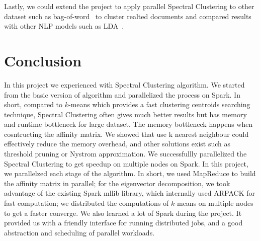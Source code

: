 \documentclass{acm_proc_article-sp}
\begin{document}
Lastly, we could extend the project to apply parallel Spectral Clustering to other dataset such as bag-of-word~\cite{Lichman:2013} to cluster realted documents and compared results with other NLP models such as LDA~\cite{blei2003latent}.

\section{Conclusion}
In this project we experienced with Spectral Clustering algorithm. We started from the basic version of algorithm and parallelized the process on Spark. In short, compared to $k$-means which provides a fast clustering centroids searching technique, Spectral Clustering often gives much better results but has memory and runtime bottleneck for large dataset. The memory bottleneck happens when cosntructing the affinity matrix. We showed that use k nearest neighbour could effectively reduce the memory overhead, and other solutions exist such as threshold pruning or Nystrom approximation. We successfullly parallelized the Spectral Clustering to get speedup on multiple nodes on Spark. In this project, we parallelzed each stage of the algorithm. In short, we used MapReduce to build the affinity matrix in parallel; for the eigenvector decomposition, we took advantage of the existing Spark mllib library, which internally used ARPACK for fast computation; we distributed the computations of $k$-means on multiple nodes to get a faster converge. We also learned a lot of Spark during the project. It provided us with a friendly interface for running distributed jobs, and a good abstraction and scheduling of parallel workloads.


%
%

\balancecolumns
\end{document}
